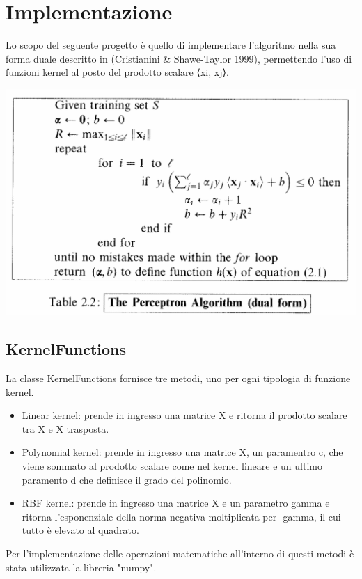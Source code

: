 \documentclass{article}
\begin{document}
	\section{Implementazione} 
	Lo scopo del seguente progetto è quello di implementare l'algoritmo nella sua forma duale descritto in (Cristianini \& Shawe-Taylor 1999), permettendo l'uso di funzioni kernel al posto del prodotto
	scalare ⟨xi, xj⟩.
	\begin{center}
		\includegraphics[width=0.7\linewidth]{pseudocodice_perceptron.png}
		\label{The Perceptron Algorithm (dual form)}
	\end{center}
	\subsection{KernelFunctions}
	La classe KernelFunctions fornisce tre metodi, uno per ogni tipologia di funzione kernel. 
	\begin{itemize}
		\item Linear kernel: prende in ingresso una matrice X e ritorna il prodotto scalare tra X e X trasposta.
		\item Polynomial kernel: prende in ingresso una matrice X, un paramentro c, che viene sommato al prodotto scalare come nel kernel lineare e un ultimo paramento d che definisce il grado del polinomio. 
		\item RBF kernel: prende in ingresso una matrice X e un parametro gamma e ritorna l'esponenziale della norma negativa moltiplicata per -gamma, il cui tutto è elevato al quadrato.
	\end{itemize}
	Per l'implementazione delle operazioni matematiche all'interno di questi metodi è stata utilizzata la libreria "numpy".
\end{document}
